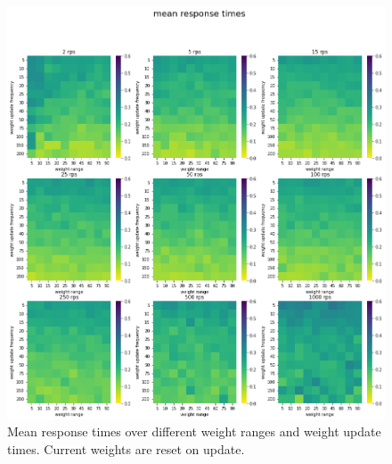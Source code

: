 \documentclass[draft,final]{vutinfth} %
\begin{document}
\begin{figure}
    \centering
    \includegraphics[width=14cm]{graphics/graphs/lb_hyper_mean_with_reset.png}
    \caption{Mean response times over different weight ranges and weight update times. Current weights are reset on update.}
    \label{fig:lb_hyper_reset_mean}
\end{figure}
\end{document}
